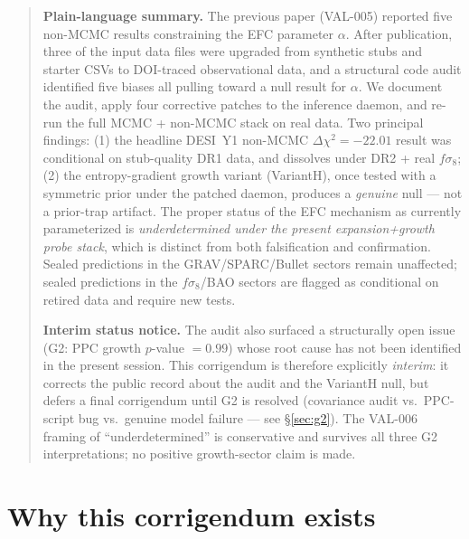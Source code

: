 \documentclass[11pt]{article}
\begin{document}
\vspace{6pt}
\begin{quote}
\textbf{Plain-language summary.}
The previous paper (VAL-005) reported five non-MCMC results constraining the
EFC parameter $\alpha$. After publication, three of the input data files were
upgraded from synthetic stubs and starter CSVs to DOI-traced observational
data, and a structural code audit identified five biases all pulling toward a
null result for $\alpha$. We document the audit, apply four corrective
patches to the inference daemon, and re-run the full MCMC + non-MCMC stack on
real data. Two principal findings: (1) the headline DESI~Y1
non-MCMC $\Delta\chi^2 = -22.01$ result was conditional on stub-quality DR1
data, and dissolves under DR2 + real $f\sigma_8$; (2) the entropy-gradient
growth variant (VariantH), once tested with a symmetric prior under the
patched daemon, produces a \emph{genuine} null --- not a prior-trap
artifact. The proper status of the EFC mechanism as currently parameterized
is \emph{underdetermined under the present expansion+growth probe stack},
which is distinct from both falsification and confirmation.
Sealed predictions in the GRAV/SPARC/Bullet sectors remain unaffected; sealed
predictions in the $f\sigma_8$/BAO sectors are flagged as conditional on
retired data and require new tests.
\par\smallskip
\textbf{Interim status notice.} The audit also surfaced a structurally open
issue (G2: PPC growth $p$-value $=0.99$) whose root cause has not been
identified in the present session. This corrigendum is therefore explicitly
\emph{interim}: it corrects the public record about the audit and the
VariantH null, but defers a final corrigendum until G2 is resolved (covariance
audit vs.\ PPC-script bug vs.\ genuine model failure --- see \S\ref{sec:g2}).
The VAL-006 framing of ``underdetermined'' is conservative and survives all
three G2 interpretations; no positive growth-sector claim is made.
\end{quote}

\section{Why this corrigendum exists}
\end{document}
